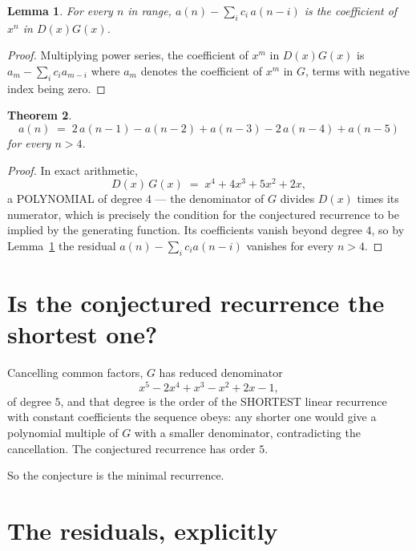 \documentclass[11pt,a4paper]{article}
\theoremstyle{plain}
\newtheorem{theorem}{Theorem}
\newtheorem{lemma}[theorem]{Lemma}
\theoremstyle{definition}
\begin{document}
\begin{lemma}\label{lem:key}
For every $n$ in range, $a(n)-\sum_i c_i\,a(n-i)$ is the coefficient of $x^{n}$ in
$D(x)G(x)$.
\end{lemma}

\begin{proof}
Multiplying power series, the coefficient of $x^{m}$ in $D(x)G(x)$ is
$a_m-\sum_i c_i a_{m-i}$ where $a_m$ denotes the coefficient of $x^{m}$ in $G$, terms with
negative index being zero.
\end{proof}

\begin{theorem}
\[
a(n)\;=\;2\,a(n-1) - a(n-2) + a(n-3) - 2\,a(n-4) + a(n-5)
\]
for every $n>4$.
\end{theorem}

\begin{proof}
In exact arithmetic,
\[
D(x)\,G(x)\;=\;x^{4} + 4 x^{3} + 5 x^{2} + 2 x,
\]
a POLYNOMIAL of degree $4$ --- the denominator of $G$ divides $D(x)$ times its numerator,
which is precisely the condition for the conjectured recurrence to be implied by the
generating function. Its coefficients vanish beyond degree $4$, so by
Lemma~\ref{lem:key} the residual $a(n)-\sum_ic_ia(n-i)$ vanishes for every
$n>4$.
\end{proof}

\section{Is the conjectured recurrence the shortest one?}

Cancelling common factors, $G$ has reduced denominator
\[
x^{5} - 2 x^{4} + x^{3} - x^{2} + 2 x - 1,
\]
of degree $5$, and that degree is the order of the SHORTEST linear recurrence with
constant coefficients the sequence obeys: any shorter one would give a polynomial multiple of
$G$ with a smaller denominator, contradicting the cancellation. The conjectured recurrence has
order $5$.

So the conjecture is the minimal recurrence.

\section{The residuals, explicitly}
\end{document}
